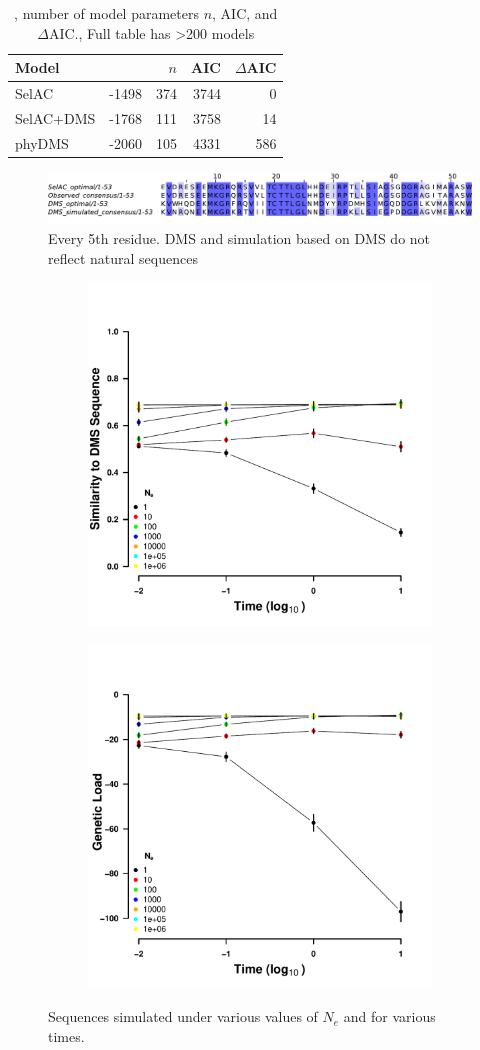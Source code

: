 \documentclass[12pt]{article}
\begin{document}
\begin{table}
  \centering
  \begin{tabular}{lrrrr}
    Model	& \LLik &$n$ & AIC & $\Delta$AIC\\ \hline 
    SelAC	& -1498 & 374& 3744&  0\\
    SelAC+DMS 	& -1768 & 111& 3758& 14\\
    phyDMS 	& -2060 & 105& 4331& 586\\

  \end{tabular}
  \caption{\LLik, number of model parameters $n$, AIC, and $\Delta$AIC., Full table has >200 models}
  \label{tab:AIC}
\end{table}


\begin{figure}[H]
     \centering
	\includegraphics[width=\textwidth]{img/seq_simil_short.pdf}
	\caption{Every 5th residue. DMS and simulation based on DMS do not reflect natural sequences}
	\label{fig:sim_seqs_cons}
\end{figure}

\begin{figure}[h]
    \centering
    \begin{subfigure}
        \centering
        \includegraphics[width=.45\textwidth]{img/simulated_dist_time.pdf}
    \end{subfigure}
    \begin{subfigure}
        \centering
        \includegraphics[width=.45\textwidth]{img/simulated_gl_time.pdf}
    \end{subfigure}
    \caption{Sequences simulated under various values of $N_e$ and for various times.}
    \label{fig:dms_sim}
\end{figure}
\end{document}

